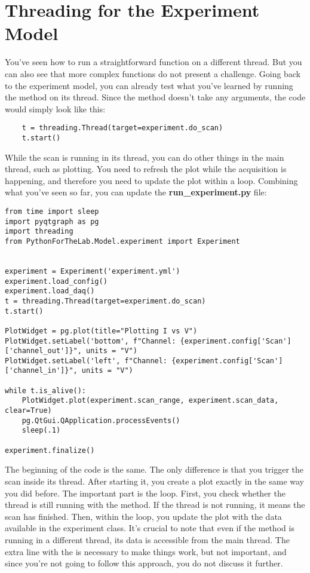 \section{Threading for the Experiment Model}\label{sec:threads-experiment-model}
You've seen how to run a straightforward function on a different thread. But you can also see that more complex functions do not present a challenge. Going back to the experiment model, you can already test what you've learned by running the  method on its thread. Since the method doesn't take any arguments, the code would simply look like this:

\begin{verbatim}
    t = threading.Thread(target=experiment.do_scan)
    t.start()
\end{verbatim}

While the scan is running in its thread, you can do other things in the main thread, such as plotting. You need to refresh the plot while the acquisition is happening, and therefore you need to update the plot within a loop. Combining what you've seen so far, you can update the \textbf{run\_experiment.py} file:

\begin{verbatim}
from time import sleep
import pyqtgraph as pg
import threading
from PythonForTheLab.Model.experiment import Experiment


experiment = Experiment('experiment.yml')
experiment.load_config()
experiment.load_daq()
t = threading.Thread(target=experiment.do_scan)
t.start()

PlotWidget = pg.plot(title="Plotting I vs V")
PlotWidget.setLabel('bottom', f"Channel: {experiment.config['Scan']['channel_out']}", units = "V")
PlotWidget.setLabel('left', f"Channel: {experiment.config['Scan']['channel_in']}", units = "V")

while t.is_alive():
    PlotWidget.plot(experiment.scan_range, experiment.scan_data, clear=True)
    pg.QtGui.QApplication.processEvents()
    sleep(.1)

experiment.finalize()
\end{verbatim}

The beginning of the code is the same. The only difference is that you trigger the scan inside its thread. After starting it, you create a plot exactly in the same way you did before. The important part is the  loop. First, you check whether the thread is still running with the  method. If the thread is not running, it means the scan has finished. Then, within the loop, you update the plot with the data available in the experiment class. It's crucial to note that even if the  method is running in a different thread, its data is accessible from the main thread. The extra line with the  is necessary to make things work, but not important, and since you're not going to follow this approach, you do not discuss it further.

